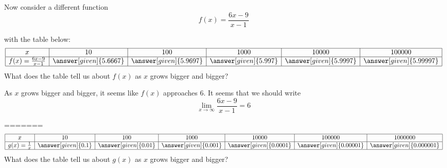 \documentclass{ximera}
\begin{document}
\begin{example}
\begin{example}
  Now consider a different function
  \[
  f(x) = \frac{6x-9}{x-1}
  \]
  \begin{image}
  \end{image}
with the table below:
\[
\begin{array}{|c|c|c|c|c|c|}
  \hline
  x & 10 & 100& 1000&10000 & 100000 \\\hline
  f(x)=\frac{6x-9}{x-1} & \answer[given]{5.6667} & \answer[given]{5.9697} & \answer[given]{5.997} & \answer[given]{5.9997} & \answer[given]{5.99997}  \\
  \hline
\end{array}
\]
What does the table tell us about $f(x)$ as $x$ grows bigger and bigger?
\begin{explanation}
  As $x$ grows bigger and bigger, it seems like $f(x)$ approaches $6$.
  It seems that we should write
  \[
 \lim_{x\to \infty}\frac{6x-9}{x-1}=6 
 \]
\end{explanation}
=======
  \[
\begin{array}{|c|c|c|c|c|c|c|}
\hline
x & 10 & 100 & 1000 &10000 & 100000 & 1000000  \\
\hline
g(x)=\frac{1}{x} & \answer[given]{0.1} & \answer[given]{0.01} & \answer[given]{0.001} & \answer[given]{0.0001} & \answer[given]{0.00001} & \answer[given]{0.000001} \\
\hline
\end{array}
  \]
  What does the table tell us about $g(x)$ as $x$ grows bigger and bigger?
  \begin{explanation}
    

\end{explanation}
\end{example}
\end{example}
\end{document}
